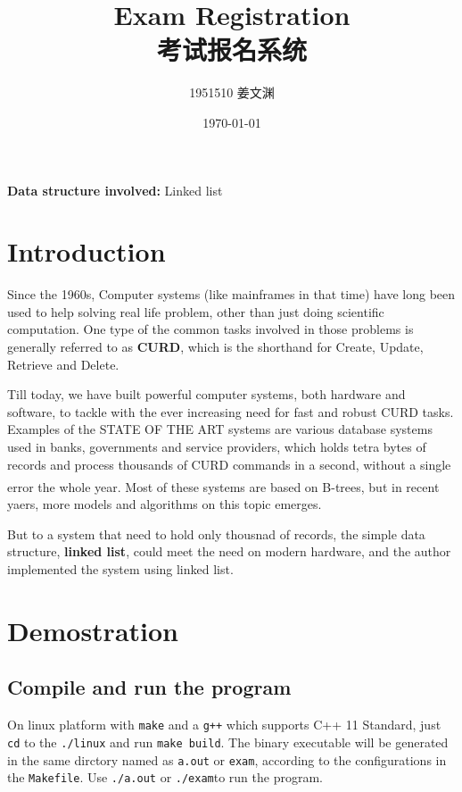 \documentclass[cn,black,12pt,normal]{elegantnote}
\title{Exam Registration\\考试报名系统}
\author{1951510\; 姜文渊}
\institute{\small \url{https://github.com/jwyjohn/Jwy_DataStructureHomework}}
\date{\today}
\newcommand{\uct}[1]{\textsuperscript{\textsuperscript{\cite{#1}}}}
\begin{document}
\maketitle

\textbf{Data structure involved:} Linked list


\tableofcontents

\newpage


\section{Introduction}

Since the 1960s, Computer systems (like mainframes in that time) have long been used to help solving real life problem, other than just doing scientific computation. One type of the common tasks involved in those problems is generally referred to as \textbf{CURD}, which is the shorthand for Create, Update, Retrieve and Delete.

Till today, we have built powerful computer systems, both hardware and software, to tackle with the ever increasing need for fast and robust CURD tasks. Examples of the STATE OF THE ART systems are various database systems used in banks, governments and service providers, which holds tetra bytes of records and process thousands of CURD commands in a second, without a single error the whole year. Most of these systems are based on B-trees\uct{bayer1970textordfeminineorganization}, but in recent yaers, more models and algorithms on this topic emerges.

But to a system that need to hold only thousnad of records, the simple data structure, \textbf{linked list}, could meet the need on modern hardware, and the author implemented the system using linked list.

\section{Demostration}

\subsection{Compile and run the program}

On linux platform with \lstinline{make} and a \lstinline{g++} which supports C++ 11 Standard, just \lstinline{cd} to the \lstinline{./linux} and run \lstinline{make build}. The binary executable will be generated in the same dirctory named as \lstinline{a.out} or \lstinline{exam}, according to the configurations in the \lstinline{Makefile}. Use \lstinline{./a.out} or \lstinline{./exam}to run the program.
\end{document}
